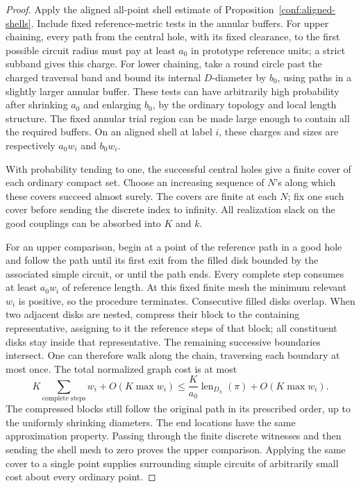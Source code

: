 \begin{proof}
Apply the aligned all-point shell estimate of
Proposition~\ref{conf:aligned-shells}. Include fixed reference-metric tests in the
annular buffers. For upper chaining, every path from the central hole, with
its fixed clearance, to the first possible circuit radius must pay at least
$a_0$ in prototype reference units; a strict subband gives this charge.
For lower chaining, take a round circle past the charged traversal band and
bound its internal $D$-diameter by $b_0$, using paths in a slightly larger
annular buffer. These tests can have arbitrarily high probability after
shrinking $a_0$ and enlarging $b_0$, by the ordinary topology and local length
structure. The fixed annular trial region can be made large enough to contain
all the required buffers. On an aligned shell at label $i$, these charges and
sizes are respectively $a_0w_i$ and $b_0w_i$.

With probability tending to one, the successful central holes give a finite
cover of each ordinary compact set. Choose an increasing sequence of $N$'s
along which these covers succeed almost surely. The covers are finite at
each $N$; fix one such cover before sending the discrete index to infinity.
All realization slack on the good couplings can be absorbed into $K$ and $k$.

For an upper comparison, begin at a point of the reference path in a good
hole and follow the path until its first exit from the filled disk bounded
by the associated simple circuit, or until the path ends. Every complete
step consumes at least $a_0w_i$ of reference length. At this fixed finite
mesh the minimum relevant $w_i$ is positive, so the procedure terminates.
Consecutive filled disks overlap. When two adjacent disks are nested,
compress their block to the containing representative, assigning to it the
reference steps of that block; all constituent disks stay inside that
representative. The remaining successive boundaries intersect. One can
therefore walk along the chain, traversing each boundary at most once.
The total normalized graph cost is at most
\[
 K\sum_{\text{complete steps}}w_i+O(K\max w_i)
 \le \frac K{a_0}\operatorname{len}_{D_h}(\pi)+O(K\max w_i).
\]
The compressed blocks still follow the original path in its prescribed
order, up to the uniformly shrinking diameters. The end locations have the
same approximation property. Passing through the finite discrete witnesses
and then sending the shell mesh to zero proves the upper comparison.
Applying the same cover to a single point supplies surrounding simple
circuits of arbitrarily small cost about every ordinary point.


\end{proof}
